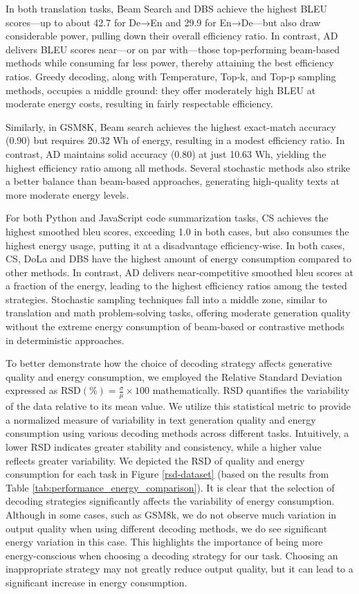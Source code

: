 In both translation tasks, Beam Search and DBS achieve the highest BLEU scores—up to about 42.7 for De→En and 29.9 for En→De—but also draw considerable power, pulling down their overall efficiency ratio. In contrast, AD delivers BLEU scores near—or on par with—those top‐performing beam‐based methods while consuming far less power, thereby attaining the best efficiency ratios. Greedy decoding, along with Temperature, Top‐k, and Top‐p sampling methods, occupies a middle ground: they offer moderately high BLEU at moderate energy costs, resulting in fairly respectable efficiency.

Similarly, in GSM8K, Beam search achieves the highest exact-match accuracy (0.90) but requires 20.32 Wh of energy, resulting in a modest efficiency ratio. In contrast, AD maintains solid accuracy (0.80) at just 10.63 Wh, yielding the highest efficiency ratio among all methods. Several stochastic methods also strike a better balance than beam-based approaches, generating high-quality texts at more moderate energy levels. 

For both Python and JavaScript code summarization tasks, CS achieves the highest smoothed bleu scores, exceeding 1.0 in both cases, but also consumes the highest energy usage, putting it at a disadvantage efficiency‐wise. In both cases, CS, DoLa and DBS have the highest amount of energy consumption compared to other methods. In contrast, AD delivers near‐competitive smoothed bleu scores at a fraction of the energy, leading to the highest efficiency ratios among the tested strategies. Stochastic sampling techniques fall into a middle zone, similar to translation and math problem-solving tasks, offering moderate generation quality without the extreme energy consumption of beam-based or contrastive methods in deterministic approaches. 

To better demonstrate how the choice of decoding strategy affects generative quality and energy consumption, we employed the Relative Standard Deviation expressed as \(\text{RSD} (\%) = \frac{\sigma}{\mu} \times 100\) mathematically. RSD quantifies the variability of the data relative to its mean value. We utilize this statistical metric to provide a normalized measure of variability in text generation quality and energy consumption using various decoding methods across different tasks. Intuitively, a lower RSD indicates greater stability and consistency, while a higher value reflects greater variability. We depicted the RSD of quality and energy consumption for each task in Figure \ref{rsd-dataset} (based on the results from Table \ref{tab:performance_energy_comparison}). It is clear that the selection of decoding strategies significantly affects the variability of energy consumption. Although in some cases, such as GSM8k, we do not observe much variation in output quality when using different decoding methods, we do see significant energy variation in this case. This highlights the importance of being more energy-conscious when choosing a decoding strategy for our task. Choosing an inappropriate strategy may not greatly reduce output quality, but it can lead to a significant increase in energy consumption.   

